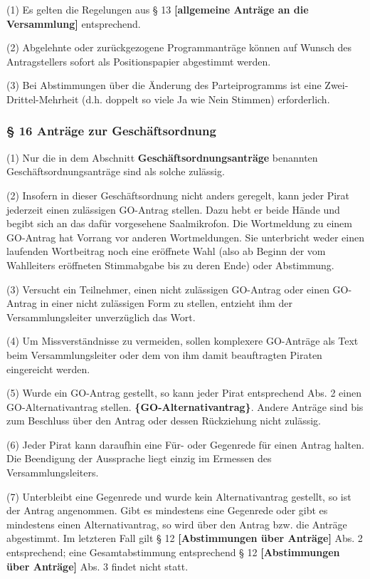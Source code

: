 (1) Es gelten die Regelungen aus § 13 \textbf{{[}allgemeine Anträge an
die Versammlung{]}} entsprechend.

(2) Abgelehnte oder zurückgezogene Programmanträge können auf Wunsch des
Antragstellers sofort als Positionspapier abgestimmt werden.

(3) Bei Abstimmungen über die Änderung des Parteiprogramms ist eine
Zwei-Drittel-Mehrheit (d.h. doppelt so viele Ja wie Nein Stimmen)
erforderlich.

\subsubsection{§ 16 Anträge zur Geschäftsordnung}

(1) Nur die in dem Abschnitt \textbf{Geschäftsordnungsanträge} benannten
Geschäftsordnungsanträge sind als solche zulässig.

(2) Insofern in dieser Geschäftsordnung nicht anders geregelt, kann
jeder Pirat jederzeit einen zulässigen GO-Antrag stellen. Dazu hebt er
beide Hände und begibt sich an das dafür vorgesehene Saalmikrofon. Die
Wortmeldung zu einem GO-Antrag hat Vorrang vor anderen Wortmeldungen.
Sie unterbricht weder einen laufenden Wortbeitrag noch eine eröffnete
Wahl (also ab Beginn der vom Wahlleiters eröffneten Stimmabgabe bis zu
deren Ende) oder Abstimmung.

(3) Versucht ein Teilnehmer, einen nicht zulässigen GO-Antrag oder einen
GO-Antrag in einer nicht zulässigen Form zu stellen, entzieht ihm der
Versammlungsleiter unverzüglich das Wort.

(4) Um Missverständnisse zu vermeiden, sollen komplexere GO-Anträge als
Text beim Versammlungsleiter oder dem von ihm damit beauftragten Piraten
eingereicht werden.

(5) Wurde ein GO-Antrag gestellt, so kann jeder Pirat entsprechend Abs.
2 einen GO-Alternativantrag stellen. \textbf{\{GO-Alternativantrag\}}.
Andere Anträge sind bis zum Beschluss über den Antrag oder dessen
Rückziehung nicht zulässig.

(6) Jeder Pirat kann daraufhin eine Für- oder Gegenrede für einen Antrag
halten. Die Beendigung der Aussprache liegt einzig im Ermessen des
Versammlungsleiters.

(7) Unterbleibt eine Gegenrede und wurde kein Alternativantrag gestellt,
so ist der Antrag angenommen. Gibt es mindestens eine Gegenrede oder
gibt es mindestens einen Alternativantrag, so wird über den Antrag bzw.
die Anträge abgestimmt. Im letzteren Fall gilt § 12
\textbf{{[}Abstimmungen über Anträge{]}} Abs. 2 entsprechend; eine
Gesamtabstimmung entsprechend § 12 \textbf{{[}Abstimmungen über
Anträge{]}} Abs. 3 findet nicht statt.

